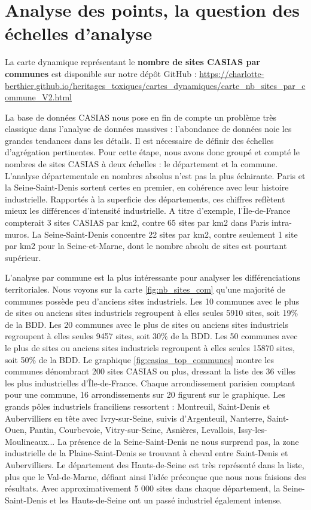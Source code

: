 \documentclass[a4paper,twoside,12pt]{book}
\begin{document}
\section{Analyse des points, la question des échelles d'analyse }
\begin{tcolorbox}[colback=gray!5!white,colframe=gray!20!white]
La carte dynamique représentant le \textbf{nombre de sites CASIAS par communes} est disponible sur notre dépôt GitHub : \url{https://charlotte-berthier.github.io/heritages_toxiques/cartes_dynamiques/carte_nb_sites_par_commune_V2.html}
\end{tcolorbox}

La base de données CASIAS nous pose en fin de compte un problème très classique dans l'analyse de données massives : l'abondance de données noie les grandes tendances dans les détails. Il est nécessaire de définir des échelles d'agrégation pertinentes. Pour cette étape, nous avons donc groupé et compté le nombres de sites CASIAS à deux échelles : le département et la commune. L'analyse départementale en nombres absolus n'est pas la plus éclairante. Paris et la Seine-Saint-Denis sortent certes en premier, en cohérence avec leur histoire industrielle. Rapportés à la superficie des départements, ces chiffres reflètent mieux les différences d'intensité industrielle. A titre d'exemple, l'Île-de-France compterait 3 sites CASIAS par km2, contre 65 sites par km2 dans Paris intra-muros. La Seine-Saint-Denis concentre 22 sites par km2, contre seulement 1 site par km2 pour la Seine-et-Marne, dont le nombre absolu de sites est pourtant supérieur. 

L'analyse par commune est la plus intéressante pour analyser les différenciations territoriales. Nous voyons sur la carte \ref{fig:nb_sites_com} qu'une majorité de communes possède peu d'anciens sites industriels. Les 10 communes avec le plus de sites ou anciens sites industriels regroupent à elles seules 5910 sites, soit 19\% de la BDD. Les 20 communes avec le plus de sites ou anciens sites industriels regroupent à elles seules 9457 sites, soit 30\% de la BDD. Les 50 communes avec le plus de sites ou anciens sites industriels regroupent à elles seules 15870 sites, soit 50\% de la BDD. Le graphique \ref{fig:casias_top_communes} montre les communes dénombrant 200 sites CASIAS ou plus, dressant la liste des 36 villes les plus industrielles d'Île-de-France. Chaque arrondissement parisien comptant pour une commune, 16 arrondissements sur 20 figurent sur le graphique. Les grands pôles industriels franciliens ressortent : Montreuil, Saint-Denis et Aubervilliers en tête avec Ivry-sur-Seine, suivis d'Argenteuil, Nanterre, Saint-Ouen, Pantin, Courbevoie, Vitry-sur-Seine, Asnières, Levallois, Issy-les-Moulineaux... La présence de la Seine-Saint-Denis ne nous surprend pas, la zone industrielle de la Plaine-Saint-Denis se trouvant à cheval entre Saint-Denis et Aubervilliers. Le département des Hauts-de-Seine est très représenté dans la liste, plus que le Val-de-Marne, défiant ainsi l'idée préconçue que nous nous faisions des résultats. Avec approximativement 5 000 sites dans chaque département, la Seine-Saint-Denis et les Hauts-de-Seine ont un passé industriel également intense. 
\end{document}
